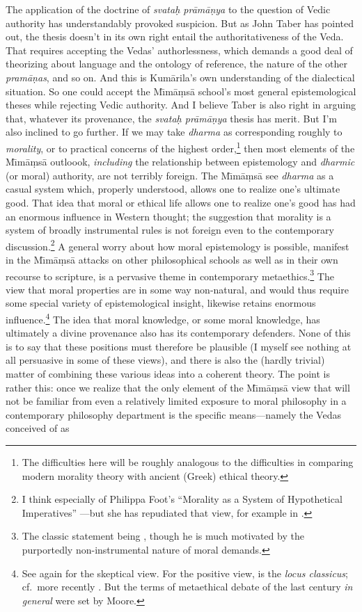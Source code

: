 ﻿\documentclass[11pt]{amsart}
\begin{document}
The application of the doctrine of \emph{svata\d h pr\=am\=a\d nya} to the question of Vedic authority has understandably provoked suspicion. But as John Taber has pointed out, the thesis doesn't in its own right entail the authoritativeness of the Veda. That requires accepting the Vedas' authorlessness, which demands a good deal of theorizing about language and the ontology of reference, the nature of the other \emph{pram\=a\d nas}, and so on. And this is Kum\=arila's own understanding of the dialectical situation. So one could accept the M\={\i}m\=a\d ms\=a school's most general epistemological theses while rejecting Vedic authority. And I believe Taber is also right in arguing that, whatever its provenance, the \emph{svata\d h pr\=am\=a\d nya} thesis has merit.
But I'm also inclined to go further. If we may take \emph{dharma} as corresponding roughly to \emph{morality}, or to practical concerns of the highest order,\footnote{The difficulties here will be roughly analogous to the difficulties in comparing modern morality theory with ancient (Greek) ethical theory.} then most elements of the M\={\i}m\=a\d ms\=a outloook, \emph{including} the relationship between epistemology and \emph{dharmic} (or moral) authority, are not terribly foreign. The M\={\i}m\=a\d ms\=a see \emph{dharma} as a casual system which, properly understood, allows one to realize one's ultimate good. That idea that moral or ethical life allows one to realize one's good has had an enormous influence in Western thought; the suggestion that morality is a system of broadly instrumental rules is not foreign even to the contemporary discussion.\footnote{I think especially of Philippa Foot's ``Morality as a System of Hypothetical Imperatives'' \citep{foot1972morality}---but she has repudiated that view, for example in \citet{foot2003natural}.} A general worry about how moral epistemology is possible, manifest in the M\={\i}m\=a\d ms\=a attacks on other philosophical schools as well as in their own recourse to scripture, is a pervasive theme in contemporary metaethics.\footnote{The classic statement being \citet{mackie1977ethics}, though he is much motivated by the purportedly non-instrumental nature of moral demands.} The view that moral properties are in some way non-natural, and would thus require some special variety of epistemological insight, likewise retains enormous influence.\footnote{See again \citet{mackie1977ethics} for the skeptical view. For the positive view, \citet{moore1903principia} is the \emph{locus classicus}; cf.~more recently \citet{huemer2005ethical}. But the terms of metaethical debate of the last century \emph{in general} were set by Moore.} The idea that moral knowledge, or some moral knowledge, has ultimately a divine provenance also has its contemporary defenders. None of this is to say that these positions must therefore be plausible (I myself see nothing at all persuasive in some of these views), and there is also the (hardly trivial) matter of combining these various ideas into a coherent theory. The point is rather this: once we realize that the only element of the M\={\i}m\=a\d ms\=a view that will not be familiar from even a relatively limited exposure to moral philosophy in a contemporary philosophy department is the specific means---namely the Vedas conceived of as 
\end{document}
